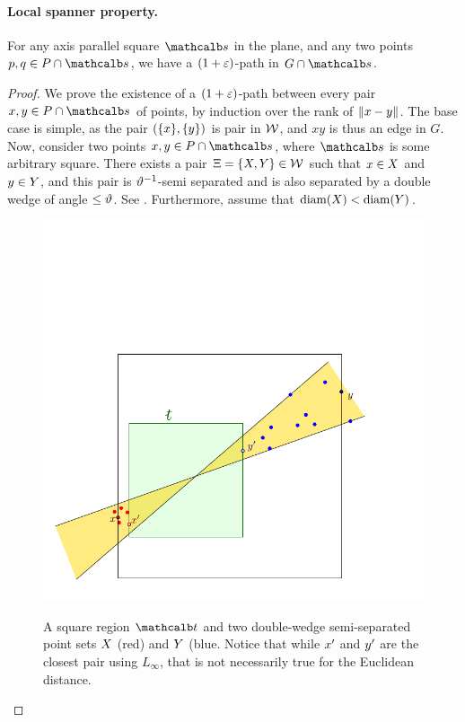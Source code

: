 \documentclass[12pt]{article}%
\begin{document}
\paragraph{Local spanner property.}
\begin{lemma}
    For any axis parallel square $\sqr$ in the plane, and any two
    points $\pa, \pb \in \PS \cap \sqr$, we have a $(1+\varepsilon)$-path in
    $\restrictY{\G}{\sqr}$.
\end{lemma}
\begin{proof}
    We prove the existence of a $(1+\varepsilon)$-path between every pair $x,y\in  \PS \cap \sqr$ of points, by induction over the rank of $\left\| x - y \right\|$. The base case is simple, as the pair $(\{x\},\{y\})$ is  pair in $\mathcal{W}$, and $xy$ is thus an edge in $G$. Now, consider two points $\px, \py \in \PS \cap \sqr$, where $\sqr$ is
    some arbitrary square. There exists a pair
    $\Xi = \{ X, Y \} \in \mathcal{W}$ such that $x \in X$ and
    $y \in Y$, and this pair is $\vartheta^{-1}$-semi separated and
    is also separated by a double wedge of angle $\leq \vartheta$.  See
    .  Furthermore, assume that
    $\diameterX{\PSX} < \diameterX{\PSY}$.
 
    \begin{figure}[h]
        \hfill%
        {\includegraphics{figs/spanner_sq}} \hfill%
        \phantom{}%
        \caption{A square region $\sqrA$ and two double-wedge semi-separated point sets $X$ (red) and $Y$ (blue. Notice that while $x'$ and $y'$ are the closest pair using $L_\infty$, that is not necessarily true for the Euclidean distance.}
    \end{figure}


\end{proof}
\end{document}
